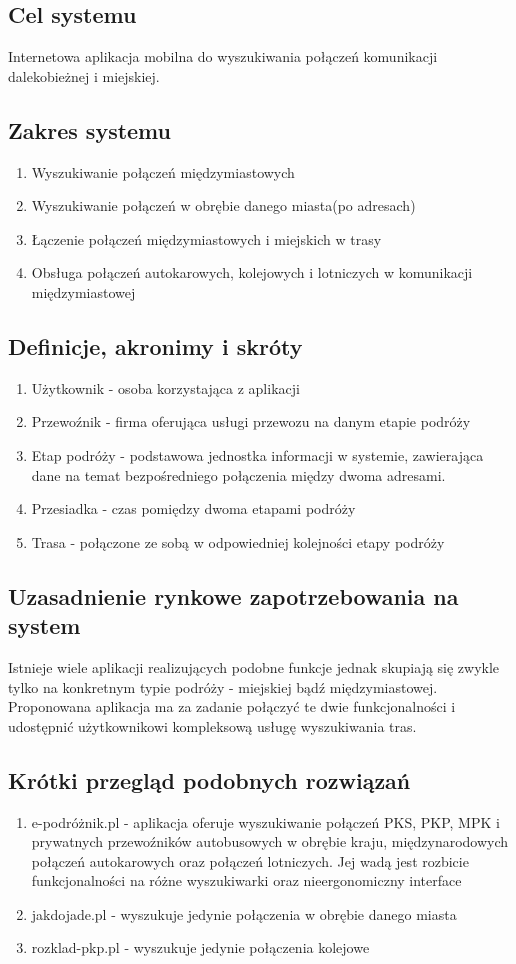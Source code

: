 \documentclass[12pt,a4paper]{report}
\begin{document}
\subsection{Cel systemu}
	Internetowa aplikacja mobilna do wyszukiwania połączeń komunikacji dalekobieżnej i miejskiej.
\subsection{Zakres systemu}
\begin{enumerate}
	\item Wyszukiwanie połączeń międzymiastowych
	\item Wyszukiwanie połączeń w obrębie danego miasta(po adresach)
	\item Łączenie połączeń międzymiastowych i miejskich w trasy
	\item Obsługa połączeń autokarowych, kolejowych i lotniczych w komunikacji międzymiastowej
\end{enumerate}
\subsection{Definicje, akronimy i skróty}
\begin{enumerate}
	\item Użytkownik - osoba korzystająca z aplikacji
	\item Przewoźnik - firma oferująca usługi przewozu na danym etapie podróży
	\item Etap podróży - podstawowa jednostka informacji w systemie, zawierająca dane na temat bezpośredniego połączenia między dwoma adresami.
	\item Przesiadka - czas pomiędzy dwoma etapami podróży
	\item Trasa - połączone ze sobą w odpowiedniej kolejności etapy podróży
\end{enumerate}
\subsection{Uzasadnienie rynkowe zapotrzebowania na system}
	Istnieje wiele aplikacji realizujących podobne funkcje jednak skupiają się zwykle tylko na konkretnym typie podróży - miejskiej bądź międzymiastowej. Proponowana aplikacja ma za zadanie połączyć te dwie funkcjonalności i udostępnić użytkownikowi kompleksową usługę wyszukiwania tras. 
\subsection{Krótki przegląd podobnych rozwiązań}
\begin{enumerate}
	\item e-podróżnik.pl - aplikacja oferuje wyszukiwanie połączeń PKS, PKP, MPK i prywatnych przewoźników autobusowych w obrębie kraju, międzynarodowych połączeń autokarowych oraz połączeń lotniczych. Jej wadą jest rozbicie funkcjonalności na różne wyszukiwarki oraz nieergonomiczny interface
	\item jakdojade.pl - wyszukuje jedynie połączenia w obrębie danego miasta
	\item rozklad-pkp.pl - wyszukuje jedynie połączenia kolejowe
\end{enumerate}
\newpage
\end{document}

